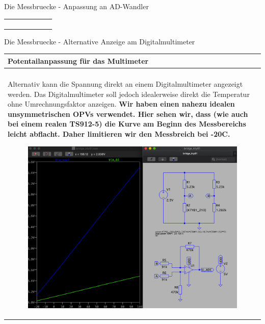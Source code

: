 \begin{frame}[t]{Die Messbruecke - Anpassung an AD-Wandler}
\begin{spacing}{0.9}
\begin{tiny}
\begin{table}[h!]
\begin{tabular}{p{10cm} }
\begin{minipage}{\textwidth}
\begin{figure}
                        \end{figure}
                    \end{minipage}
                \end{tabular}

            \end{table}

        \end{tiny} \end{spacing}

\end{frame}

\begin{frame}[t]{Die Messbruecke - Alternative Anzeige am Digitalmultimeter}

    \begin{spacing}{0.9} \begin{tiny}
            \begin{table}[h!]
                \begin{tabular}{p{10cm} }
                    \hline
                    \textbf{Potentailanpassung für das Multimeter} \\
                    \hline                                         \\
                    \begin{minipage}{\textwidth}
                        Alternativ kann die Spannung direkt an einem Digitalmultimeter angezeigt werden. \newline
                        Das Digitalmultimeter soll jedoch idealerweise direkt die Temperatur ohne Umrechnungsfaktor anzeigen.
                        \textbf{Wir haben einen nahezu idealen unsymmetrischen OPVs verwendet. Hier sehen wir, dass (wie auch bei einem realen TS912-5) die Kurve am Beginn des Messbereichs leicht abflacht. Daher limitieren wir den Messbreich bei -20C.}
                        \begin{figure}
                            \centering
                            \includegraphics[width=0.4\linewidth]{pictures/digimul_ready.png}
                        \end{figure}

\end{minipage}
\end{tabular}
\end{table}
\end{tiny}
\end{spacing}
\end{frame}
